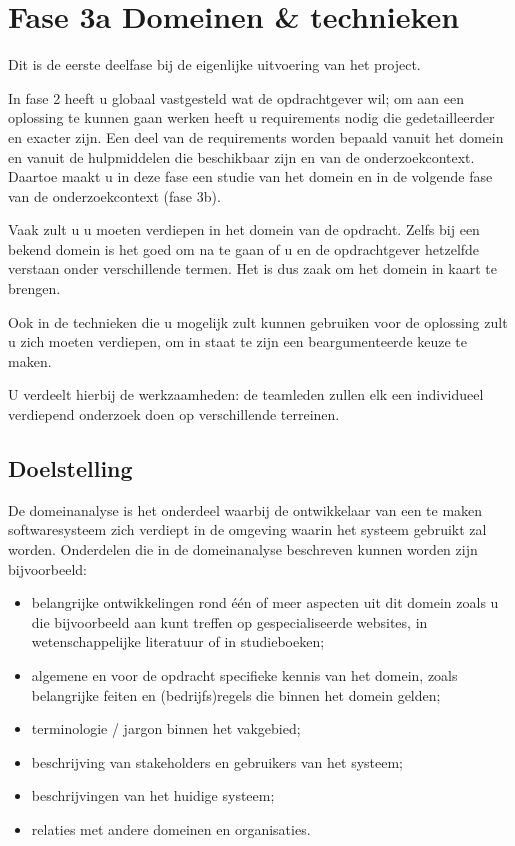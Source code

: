 \section{Fase 3a Domeinen \& technieken}
Dit is de eerste deelfase bij de eigenlijke uitvoering van het project.

In fase 2 heeft u globaal vastgesteld wat de opdrachtgever wil; om
aan een oplossing te kunnen gaan werken heeft u requirements nodig
die gedetailleerder en exacter zijn. Een deel van de requirements
worden bepaald vanuit het domein en vanuit de hulpmiddelen die
beschikbaar zijn en van de onderzoekcontext. Daartoe maakt u in
deze fase een studie van het domein en in de volgende fase van
de onderzoekcontext (fase 3b).

Vaak zult u u moeten verdiepen in het domein van de opdracht.
Zelfs bij een bekend domein is het goed om na te gaan of u en de
opdrachtgever hetzelfde verstaan onder verschillende termen. Het is
dus zaak om het domein in kaart te brengen.

Ook in de technieken die u mogelijk zult kunnen gebruiken voor de
oplossing zult u zich moeten verdiepen, om in staat te zijn een
beargumenteerde keuze te maken.

U verdeelt hierbij de werkzaamheden: de teamleden zullen elk een
individueel verdiepend onderzoek doen op verschillende terreinen.

\subsection{Doelstelling}
De domeinanalyse is het onderdeel waarbij de ontwikkelaar van een te maken
softwaresysteem zich verdiept in de omgeving waarin het systeem gebruikt zal
worden.
Onderdelen die in de domeinanalyse beschreven kunnen worden zijn bijvoorbeeld:
\begin{itemize}
    \item belangrijke ontwikkelingen rond één of meer aspecten uit dit domein zoals u
die bijvoorbeeld aan kunt treffen op gespecialiseerde websites, in
wetenschappelijke literatuur of in studieboeken;
    \item algemene en voor de opdracht specifieke kennis van het domein, zoals
belangrijke feiten en (bedrijfs)regels die binnen het domein gelden;
    \item terminologie / jargon binnen het vakgebied;
    \item beschrijving van stakeholders en gebruikers van het systeem;
    \item beschrijvingen van het huidige systeem;
    \item relaties met andere domeinen en organisaties.
\end{itemize}



